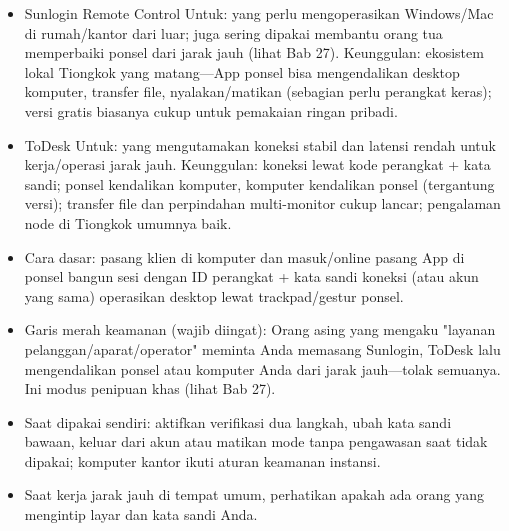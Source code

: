 \begin{itemize}
  \item Sunlogin Remote Control Untuk: yang perlu mengoperasikan Windows/Mac di rumah/kantor dari luar; juga sering dipakai membantu orang tua memperbaiki ponsel dari jarak jauh (lihat Bab 27). Keunggulan: ekosistem lokal Tiongkok yang matang—App ponsel bisa mengendalikan desktop komputer, transfer file, nyalakan/matikan (sebagian perlu perangkat keras); versi gratis biasanya cukup untuk pemakaian ringan pribadi.
  \item ToDesk Untuk: yang mengutamakan koneksi stabil dan latensi rendah untuk kerja/operasi jarak jauh. Keunggulan: koneksi lewat kode perangkat + kata sandi; ponsel kendalikan komputer, komputer kendalikan ponsel (tergantung versi); transfer file dan perpindahan multi-monitor cukup lancar; pengalaman node di Tiongkok umumnya baik.
  \item Cara dasar: pasang klien di komputer dan masuk/online pasang App di ponsel bangun sesi dengan ID perangkat + kata sandi koneksi (atau akun yang sama) operasikan desktop lewat trackpad/gestur ponsel.
  \item Garis merah keamanan (wajib diingat): Orang asing yang mengaku "layanan pelanggan/aparat/operator" meminta Anda memasang Sunlogin, ToDesk lalu mengendalikan ponsel atau komputer Anda dari jarak jauh—tolak semuanya. Ini modus penipuan khas (lihat Bab 27).
  \item Saat dipakai sendiri: aktifkan verifikasi dua langkah, ubah kata sandi bawaan, keluar dari akun atau matikan mode tanpa pengawasan saat tidak dipakai; komputer kantor ikuti aturan keamanan instansi.
  \item Saat kerja jarak jauh di tempat umum, perhatikan apakah ada orang yang mengintip layar dan kata sandi Anda.
\end{itemize}



